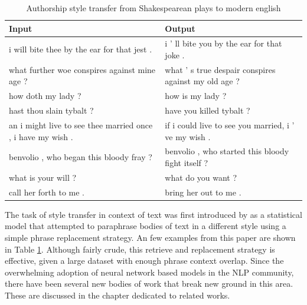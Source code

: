 \begin{table}[ht]
	\centering
	\begin{tabular}{ | p{.45\linewidth} | p{.45\linewidth} | }
		\hline
		\textbf{Input}                                              & \textbf{Output}                                      \\
		\hline \hline
		i will bite thee by the ear for that jest .                 & i ’ ll bite you by the ear for that joke .           \\
		\hline
		what further woe conspires against mine age ?               & what ’ s true despair conspires against my old age ? \\
		\hline
		how doth my lady ?                                          & how is my lady ?                                     \\
		\hline
		hast thou slain tybalt ?                                    & have you killed tybalt ?                             \\
		\hline
		an i might live to see thee married once , i have my wish . & if i could live to see you married, i ’ ve my wish . \\
		\hline
		benvolio , who began this bloody fray ?                     & benvolio , who started this bloody fight itself ?    \\
		\hline
		what is your will ?                                         & what do you want ?                                   \\
		\hline
		call her forth to me .                                      & bring her out to me .                                \\
		\hline
	\end{tabular}
	\caption{Authorship style transfer from Shakespearean plays to modern english}
	\label{tab:paraphrasing-for-style-results}
\end{table}

The task of style transfer in context of text was first introduced by \cite{xu2012paraphrasing} as a statistical model that attempted to paraphrase bodies of text in a different style using a simple phrase replacement strategy. An few examples from this paper are shown in Table \ref{tab:paraphrasing-for-style-results}. Although fairly crude, this retrieve and replacement strategy is effective, given a large dataset with enough phrase context overlap. Since the overwhelming adoption of neural network based models in the NLP community, there have been several new bodies of work that break new ground in this area. These are discussed in the chapter dedicated to related works.


